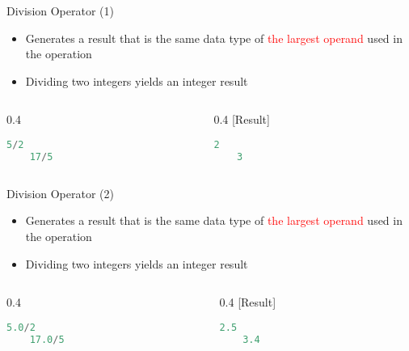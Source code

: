 \begin{frame}[fragile]{Division Operator (1)}
\begin{itemize}
	\item {Generates a result that is the same data type of \textcolor{red}{the largest operand} used in the operation}
	\item {Dividing two integers yields an integer result}
\end{itemize}
\begin{columns}
\begin{column}{0.4\linewidth}
	\begin{lstlisting}[numbers=none, language=c]
	5/2
	17/5
	\end{lstlisting}
\end{column}
\begin{column}{0.4\linewidth}
[Result]
	\begin{lstlisting}[numbers=none, language=c]
	2
	3
	\end{lstlisting}
\end{column}
\end{columns}
\end{frame}

\begin{frame}[fragile]{Division Operator (2)}
\begin{itemize}
	\item {Generates a result that is the same data type of \textcolor{red}{the largest operand} used in the operation}
	\item {Dividing two integers yields an integer result}
\end{itemize}
\begin{columns}
\begin{column}{0.4\linewidth}
	\begin{lstlisting}[numbers=none, language=c]
	5.0/2
	17.0/5
	\end{lstlisting}
\end{column}
\begin{column}{0.4\linewidth}
[Result]
	\begin{lstlisting}[numbers=none, language=c]
	2.5
	3.4
	\end{lstlisting}
\end{column}
\end{columns}
\end{frame}

